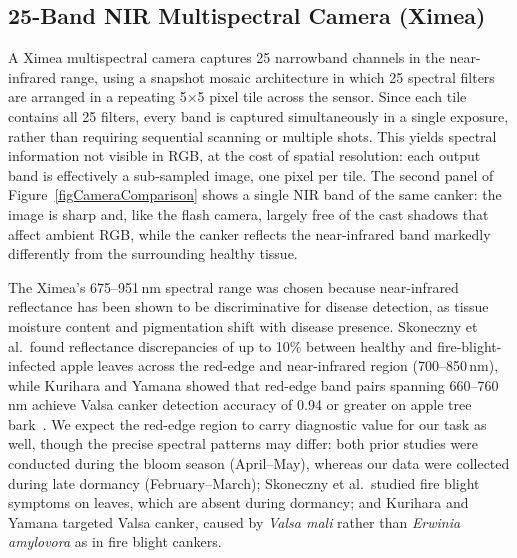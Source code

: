 \subsection{25-Band NIR Multispectral Camera (Ximea)}
\label{secXimeaCamera}

A Ximea multispectral camera captures 25 narrowband channels in
the near-infrared range, using a snapshot mosaic architecture in
which 25 spectral filters are arranged in a repeating
5$\times$5 pixel tile across the sensor.
Since each tile contains all 25 filters, every band is captured
simultaneously in a single exposure, rather than requiring
sequential scanning or multiple shots.
This yields spectral information not visible in RGB, at the cost
of spatial resolution: each output band is effectively a
sub-sampled image, one pixel per tile.
The second panel of Figure~\ref{figCameraComparison} shows a
single NIR band of the same canker: the image is sharp and, like
the flash camera, largely free of the cast shadows that affect
ambient RGB, while the canker reflects the near-infrared band
markedly differently from the surrounding healthy tissue.

The Ximea's 675--951\,nm spectral range was chosen because
near-infrared reflectance has been shown to be discriminative for
disease detection, as tissue moisture content and pigmentation shift
with disease presence.
Skoneczny et al.\ found reflectance discrepancies of up to 10\%
between healthy and fire-blight-infected apple leaves across the
red-edge and near-infrared region (700--850\,nm), while Kurihara
and Yamana showed that red-edge band pairs spanning 660--760\,nm
achieve Valsa canker detection accuracy of 0.94 or greater on
apple tree bark~\cite{Skoneczny2020DetectionFireBlightAppleHyperspectralLeaf,
Kurihara2022DetectionValsaCankerHyperspectralCanker}.
We expect the red-edge region to carry diagnostic value for our
task as well, though the precise spectral patterns may differ:
both prior studies were conducted during the bloom season
(April--May), whereas our data were collected during late
dormancy (February--March); Skoneczny et al.\ studied fire blight
symptoms on leaves, which are absent during dormancy; and
Kurihara and Yamana targeted Valsa canker, caused by
\textit{Valsa mali} rather than \textit{Erwinia amylovora}
as in fire blight cankers.


